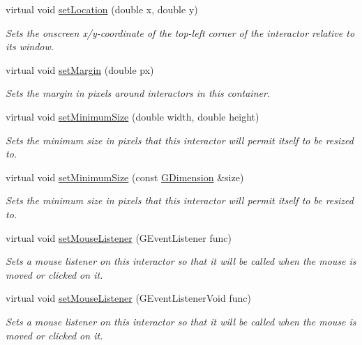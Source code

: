 \begin{DoxyCompactItemize}
virtual void \mbox{\hyperlink{classGInteractor_a04594e8ba9b98513a64f1da00dcae18c}{set\+Location}} (double x, double y)
\begin{DoxyCompactList}\small\item\em Sets the onscreen x/y-\/coordinate of the top-\/left corner of the interactor relative to its window. \end{DoxyCompactList}\item 
virtual void \mbox{\hyperlink{classGContainer_a79b7a5ffc0a63c8f11be4ed59808f60d}{set\+Margin}} (double px)
\begin{DoxyCompactList}\small\item\em Sets the margin in pixels around interactors in this container. \end{DoxyCompactList}\item 
virtual void \mbox{\hyperlink{classGInteractor_a0cf428e207b7f22cc08138a90b1b87b2}{set\+Minimum\+Size}} (double width, double height)
\begin{DoxyCompactList}\small\item\em Sets the minimum size in pixels that this interactor will permit itself to be resized to. \end{DoxyCompactList}\item 
virtual void \mbox{\hyperlink{classGInteractor_a3b1046117ac6cb7abe467e00ba8a81f4}{set\+Minimum\+Size}} (const \mbox{\hyperlink{structGDimension}{G\+Dimension}} \&size)
\begin{DoxyCompactList}\small\item\em Sets the minimum size in pixels that this interactor will permit itself to be resized to. \end{DoxyCompactList}\item 
virtual void \mbox{\hyperlink{classGInteractor_a37d8dbc943f59920f705b0104f60bde2}{set\+Mouse\+Listener}} (G\+Event\+Listener func)
\begin{DoxyCompactList}\small\item\em Sets a mouse listener on this interactor so that it will be called when the mouse is moved or clicked on it. \end{DoxyCompactList}\item 
virtual void \mbox{\hyperlink{classGInteractor_aea7f647ea62d59f71b5fad6aa65eeaf9}{set\+Mouse\+Listener}} (G\+Event\+Listener\+Void func)
\begin{DoxyCompactList}\small\item\em Sets a mouse listener on this interactor so that it will be called when the mouse is moved or clicked on it. \end{DoxyCompactList}\item 

\end{DoxyCompactItemize}
